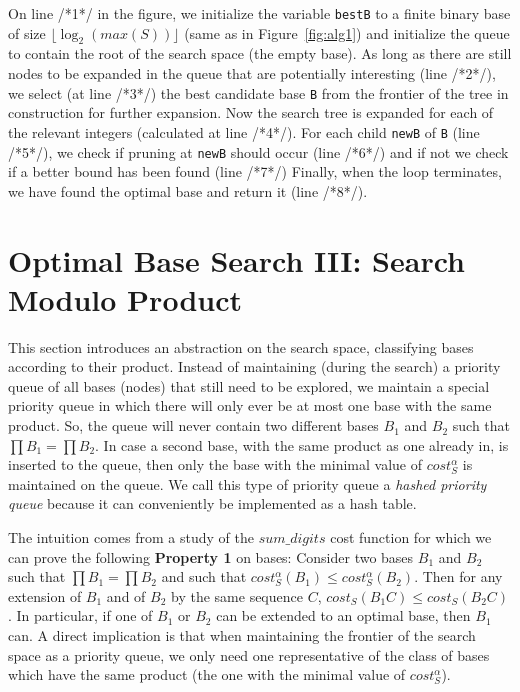 \documentclass[envcountsame]{llncs}
\newcommand{\sumDigits}{\mathit{sum\_digits}}
\newcommand{\cost}{\mathit{cost}}
\begin{document}
On line {\scriptsize /*1*/} in the figure, we initialize the variable
\texttt{bestB} to a finite binary base of size
$\lfloor\log_2(max(S))\rfloor$ (same as in Figure~\ref{fig:alg1})
and initialize the queue to contain the
root of the search space (the empty base).
As long as there are still nodes to be expanded in the queue that are
potentially interesting (line {\scriptsize /*2*/}), we select (at line
{\scriptsize /*3*/}) the best candidate base \texttt{B} from the
frontier of the tree in construction for further expansion.  Now the
search tree is expanded for each of the relevant integers (calculated
at line {\scriptsize /*4*/}). For each child \texttt{newB} of
\texttt{B} (line {\scriptsize /*5*/}), we check if pruning at
\texttt{newB} should occur (line {\scriptsize /*6*/}) and if not we
check if a better bound has been found (line {\scriptsize /*7*/})
Finally, when the loop terminates, we have found the optimal base and
return it (line {\scriptsize /*8*/}).










\section{Optimal Base Search III: Search Modulo Product}
\label{sec:ob3}

This section introduces an abstraction on the search space,
classifying bases according to their product. Instead of maintaining
(during the search) a priority queue of all bases
(nodes) that still need to be explored, we maintain a special priority
queue in which there will only ever be at most one base with the same
product.  So, the queue will never contain two
different
bases $B_1$ and $B_2$
such that $\prod B_1 = \prod B_2$.
In case a second base, with the same product as one already in, is
inserted to the queue, then
only
the base with the minimal value of
$\cost^\alpha_S$ is maintained on the queue. We call this type of
priority queue a \emph{hashed priority queue} because it
can conveniently be
implemented as a hash table.

The intuition comes from a study of the $\sumDigits$ cost function for
which we can prove the following \textbf{Property 1} on bases:
Consider two bases $B_1$ and $B_2$ such that $\prod B_1 = \prod B_2$
and such that $\cost^\alpha_S(B_1) \leq \cost^\alpha_S(B_2)$. Then for
any extension of $B_1$ and of $B_2$ by the same sequence $C$,
$\cost_S(B_1C) \leq \cost_S(B_2C)$.  In particular, if one of $B_1$ or
$B_2$ can be extended to an optimal base, then $B_1$ can.
A direct implication is that when maintaining the frontier of the
search space as a priority queue, we only need one representative of
the class of bases which have the same product (the one with the
minimal value of $\cost^\alpha_S$).
\end{document}
